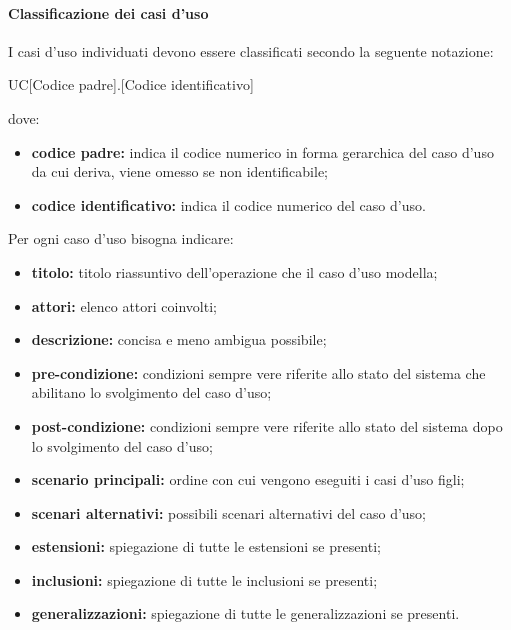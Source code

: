             \paragraph{Classificazione dei casi d'uso}
            I casi d'uso individuati devono essere classificati secondo la seguente notazione:
            \begin{center}
            UC[Codice padre].[Codice identificativo]
            \end{center}
            dove:
            \begin{itemize}
                \item \textbf{codice padre:} indica il codice numerico in forma gerarchica del caso d'uso da cui deriva, viene omesso se non identificabile;
                \item \textbf{codice identificativo:} indica il codice numerico del caso d'uso.
            \end{itemize}
            Per ogni caso d'uso bisogna indicare:
            \begin{itemize}
                \item \textbf{titolo:} titolo riassuntivo dell'operazione che il caso d'uso modella;
                \item \textbf{attori:} elenco attori coinvolti;
                \item \textbf{descrizione:} concisa e meno ambigua possibile;
                \item \textbf{pre-condizione:} condizioni sempre vere riferite allo stato del sistema che abilitano lo svolgimento del caso d'uso;
                \item \textbf{post-condizione:} condizioni sempre vere riferite allo stato del sistema dopo lo svolgimento del caso d'uso;
                \item \textbf{scenario principali:} ordine con cui vengono eseguiti i casi d'uso figli;
                \item \textbf{scenari alternativi:} possibili scenari alternativi del caso d'uso;
                \item \textbf{estensioni:} spiegazione di tutte le estensioni se presenti;
                \item \textbf{inclusioni:} spiegazione di tutte le inclusioni se presenti;
                \item \textbf{generalizzazioni:} spiegazione di tutte le generalizzazioni se presenti.
            \end{itemize}

